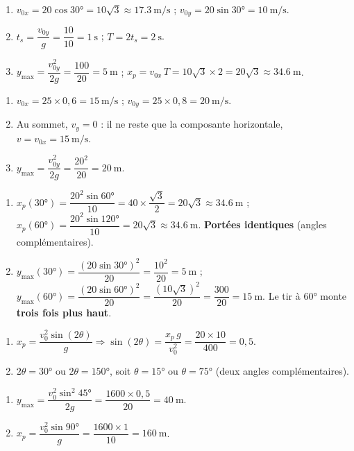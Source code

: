 \documentclass[11pt,a4paper]{article}
\begin{document}

\begin{corrige}
\begin{enumerate}[label=\alph*)]
  \item $v_{0x}=20\cos\ang{30}=10\sqrt3\approx\qty{17,3}{\metre\per\second}$ ; $v_{0y}=20\sin\ang{30}=\qty{10}{\metre\per\second}$.
  \item $t_s=\dfrac{v_{0y}}{g}=\dfrac{10}{10}=\qty{1}{\second}$ ; $T=2t_s=\qty{2}{\second}$.
  \item $y_{\max}=\dfrac{v_{0y}^2}{2g}=\dfrac{100}{20}=\qty{5}{\metre}$ ; $x_p=v_{0x}\,T=10\sqrt3\times2=20\sqrt3\approx\qty{34,6}{\metre}$.
\end{enumerate}
\end{corrige}

\begin{corrige}
\begin{enumerate}[label=\alph*)]
  \item $v_{0x}=25\times0{,}6=\qty{15}{\metre\per\second}$ ; $v_{0y}=25\times0{,}8=\qty{20}{\metre\per\second}$.
  \item Au sommet, $v_y=0$ : il ne reste que la composante horizontale, $v=v_{0x}=\qty{15}{\metre\per\second}$.
  \item $y_{\max}=\dfrac{v_{0y}^2}{2g}=\dfrac{20^2}{20}=\qty{20}{\metre}$.
\end{enumerate}
\end{corrige}

\begin{corrige}
\begin{enumerate}[label=\alph*)]
  \item $x_p(\ang{30})=\dfrac{20^2\sin\ang{60}}{10}=40\times\dfrac{\sqrt3}{2}=20\sqrt3\approx\qty{34,6}{\metre}$ ;
        $x_p(\ang{60})=\dfrac{20^2\sin\ang{120}}{10}=20\sqrt3\approx\qty{34,6}{\metre}$. \textbf{Portées identiques} (angles complémentaires).
  \item $y_{\max}(\ang{30})=\dfrac{(20\sin\ang{30})^2}{20}=\dfrac{10^2}{20}=\qty{5}{\metre}$ ;
        $y_{\max}(\ang{60})=\dfrac{(20\sin\ang{60})^2}{20}=\dfrac{(10\sqrt3)^2}{20}=\dfrac{300}{20}=\qty{15}{\metre}$. Le tir à \ang{60} monte \textbf{trois fois plus haut}.
\end{enumerate}
\end{corrige}

\begin{corrige}
\begin{enumerate}[label=\alph*)]
  \item $x_p=\dfrac{v_0^2\sin(2\theta)}{g}\Rightarrow \sin(2\theta)=\dfrac{x_p\,g}{v_0^2}=\dfrac{20\times10}{400}=0{,}5$.
  \item $2\theta=\ang{30}$ ou $2\theta=\ang{150}$, soit $\theta=\ang{15}$ ou $\theta=\ang{75}$ (deux angles complémentaires).
\end{enumerate}
\end{corrige}

\begin{corrige}
\begin{enumerate}[label=\alph*)]
  \item $y_{\max}=\dfrac{v_0^2\sin^2\ang{45}}{2g}=\dfrac{1600\times0{,}5}{20}=\qty{40}{\metre}$.
  \item $x_p=\dfrac{v_0^2\sin\ang{90}}{g}=\dfrac{1600\times1}{10}=\qty{160}{\metre}$.
\end{enumerate}
\end{corrige}
\end{document}
